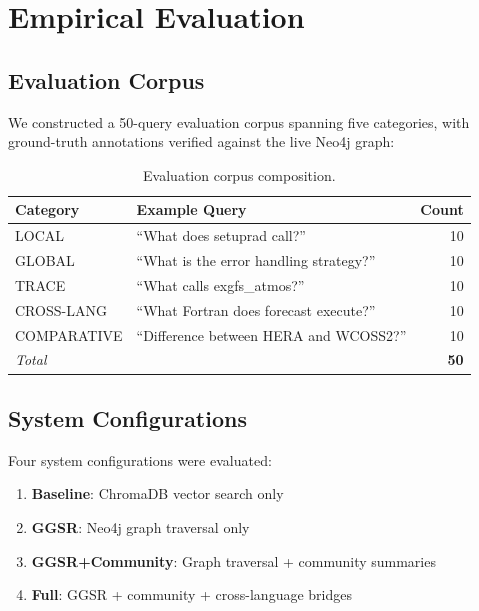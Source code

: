 \documentclass[11pt,letterpaper]{article}
\begin{document}
\section{Empirical Evaluation}
\label{sec:evaluation}

\subsection{Evaluation Corpus}

We constructed a 50-query evaluation corpus spanning five categories,
with ground-truth annotations verified against the live Neo4j graph:

\begin{table}[H]
\centering
\caption{Evaluation corpus composition.}
\label{tab:corpus}
\begin{tabular}{@{}llr@{}}
\toprule
\textbf{Category} & \textbf{Example Query} & \textbf{Count} \\
\midrule
LOCAL        & ``What does setuprad call?'' & 10 \\
GLOBAL       & ``What is the error handling strategy?'' & 10 \\
TRACE        & ``What calls exgfs\_atmos?'' & 10 \\
CROSS-LANG   & ``What Fortran does forecast execute?'' & 10 \\
COMPARATIVE  & ``Difference between HERA and WCOSS2?'' & 10 \\
\midrule
\textit{Total} & & \textbf{50} \\
\bottomrule
\end{tabular}
\end{table}

\subsection{System Configurations}

Four system configurations were evaluated:

\begin{enumerate}[nosep]
    \item \textbf{Baseline}: ChromaDB vector search only
    \item \textbf{GGSR}: Neo4j graph traversal only
    \item \textbf{GGSR+Community}: Graph traversal + community summaries
    \item \textbf{Full}: GGSR + community + cross-language bridges
\end{enumerate}
\end{document}

